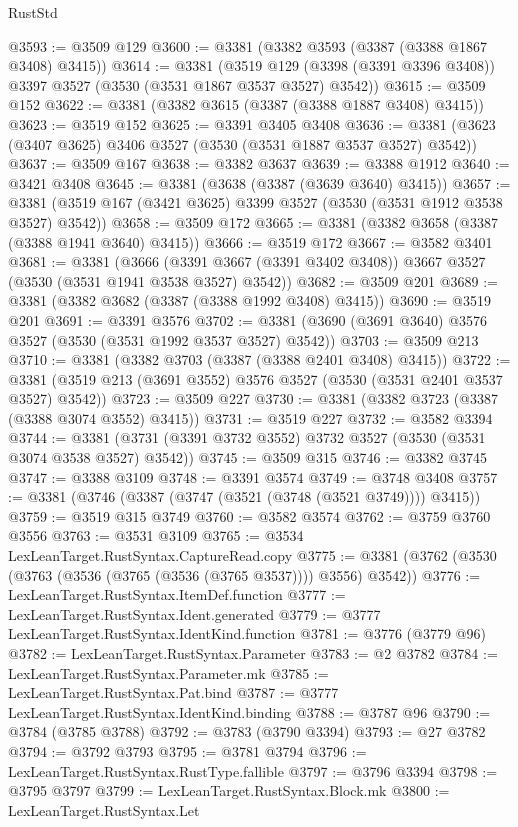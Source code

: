 \begin{lexlean}{RustStd}
\begin{coremodule}
@3593 := @3509 @129
@3600 := @3381 (@3382 @3593 (@3387 (@3388 @1867 @3408) @3415))
@3614 := @3381
    (@3519 @129 (@3398 (@3391 @3396 @3408)) @3397 @3527 (@3530 (@3531 @1867 @3537 @3527) @3542))
@3615 := @3509 @152
@3622 := @3381 (@3382 @3615 (@3387 (@3388 @1887 @3408) @3415))
@3623 := @3519 @152
@3625 := @3391 @3405 @3408
@3636 := @3381 (@3623 (@3407 @3625) @3406 @3527 (@3530 (@3531 @1887 @3537 @3527) @3542))
@3637 := @3509 @167
@3638 := @3382 @3637
@3639 := @3388 @1912
@3640 := @3421 @3408
@3645 := @3381 (@3638 (@3387 (@3639 @3640) @3415))
@3657 := @3381 (@3519 @167 (@3421 @3625) @3399 @3527 (@3530 (@3531 @1912 @3538 @3527) @3542))
@3658 := @3509 @172
@3665 := @3381 (@3382 @3658 (@3387 (@3388 @1941 @3640) @3415))
@3666 := @3519 @172
@3667 := @3582 @3401
@3681 := @3381
    (@3666 (@3391 @3667 (@3391 @3402 @3408)) @3667 @3527 (@3530 (@3531 @1941 @3538 @3527) @3542))
@3682 := @3509 @201
@3689 := @3381 (@3382 @3682 (@3387 (@3388 @1992 @3408) @3415))
@3690 := @3519 @201
@3691 := @3391 @3576
@3702 := @3381 (@3690 (@3691 @3640) @3576 @3527 (@3530 (@3531 @1992 @3537 @3527) @3542))
@3703 := @3509 @213
@3710 := @3381 (@3382 @3703 (@3387 (@3388 @2401 @3408) @3415))
@3722 := @3381 (@3519 @213 (@3691 @3552) @3576 @3527 (@3530 (@3531 @2401 @3537 @3527) @3542))
@3723 := @3509 @227
@3730 := @3381 (@3382 @3723 (@3387 (@3388 @3074 @3552) @3415))
@3731 := @3519 @227
@3732 := @3582 @3394
@3744 := @3381 (@3731 (@3391 @3732 @3552) @3732 @3527 (@3530 (@3531 @3074 @3538 @3527) @3542))
@3745 := @3509 @315
@3746 := @3382 @3745
@3747 := @3388 @3109
@3748 := @3391 @3574
@3749 := @3748 @3408
@3757 := @3381 (@3746 (@3387 (@3747 (@3521 (@3748 (@3521 @3749)))) @3415))
@3759 := @3519 @315 @3749
@3760 := @3582 @3574
@3762 := @3759 @3760 @3556
@3763 := @3531 @3109
@3765 := @3534 LexLeanTarget.RustSyntax.CaptureRead.copy
@3775 := @3381 (@3762 (@3530 (@3763 (@3536 (@3765 (@3536 (@3765 @3537)))) @3556) @3542))
@3776 := LexLeanTarget.RustSyntax.ItemDef.function
@3777 := LexLeanTarget.RustSyntax.Ident.generated
@3779 := @3777 LexLeanTarget.RustSyntax.IdentKind.function
@3781 := @3776 (@3779 @96)
@3782 := LexLeanTarget.RustSyntax.Parameter
@3783 := @2 @3782
@3784 := LexLeanTarget.RustSyntax.Parameter.mk
@3785 := LexLeanTarget.RustSyntax.Pat.bind
@3787 := @3777 LexLeanTarget.RustSyntax.IdentKind.binding
@3788 := @3787 @96
@3790 := @3784 (@3785 @3788)
@3792 := @3783 (@3790 @3394)
@3793 := @27 @3782
@3794 := @3792 @3793
@3795 := @3781 @3794
@3796 := LexLeanTarget.RustSyntax.RustType.fallible
@3797 := @3796 @3394
@3798 := @3795 @3797
@3799 := LexLeanTarget.RustSyntax.Block.mk
@3800 := LexLeanTarget.RustSyntax.Let

\end{coremodule}
\end{lexlean}
